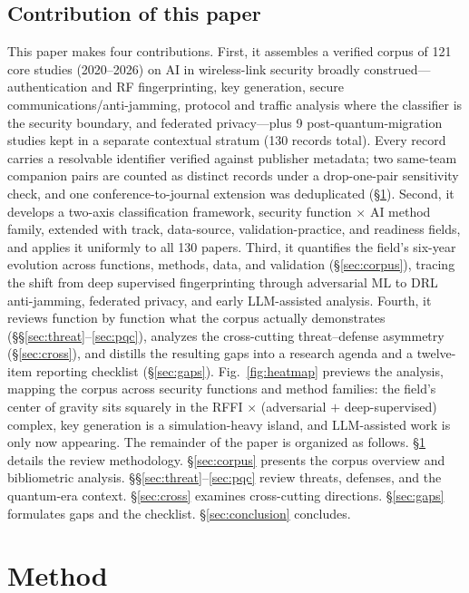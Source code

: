 \documentclass[10.5pt,compsoc,winfonts]{ICN}
\begin{document}
\subsection{Contribution of this paper}
This paper makes four contributions. First, it assembles a verified corpus of 121 core studies (2020–2026) on AI in wireless-link security broadly construed—authentication and RF fingerprinting, key generation, secure communications/anti-jamming, protocol and traffic analysis where the classifier is the security boundary, and federated privacy—plus 9 post-quantum-migration studies kept in a separate contextual stratum (130 records total). Every record carries a resolvable identifier verified against publisher metadata; two same-team companion pairs are counted as distinct records under a drop-one-pair sensitivity check, and one conference-to-journal extension was deduplicated (\S\ref{sec:methods}). Second, it develops a two-axis classification framework, security function $\times$ AI method family, extended with track, data-source, validation-practice, and readiness fields, and applies it uniformly to all 130 papers. Third, it quantifies the field's six-year evolution across functions, methods, data, and validation (\S\ref{sec:corpus}), tracing the shift from deep supervised fingerprinting through adversarial ML to DRL anti-jamming, federated privacy, and early LLM-assisted analysis. Fourth, it reviews function by function what the corpus actually demonstrates (\S\S\ref{sec:threat}–\ref{sec:pqc}), analyzes the cross-cutting threat–defense asymmetry (\S\ref{sec:cross}), and distills the resulting gaps into a research agenda and a twelve-item reporting checklist (\S\ref{sec:gaps}).
Fig.~\ref{fig:heatmap} previews the analysis, mapping the corpus across security functions and method families: the field's center of gravity sits squarely in the RFFI $\times$ (adversarial $+$ deep-supervised) complex, key generation is a simulation-heavy island, and LLM-assisted work is only now appearing. The remainder of the paper is organized as follows. \S\ref{sec:methods} details the review methodology. \S\ref{sec:corpus} presents the corpus overview and bibliometric analysis. \S\S\ref{sec:threat}–\ref{sec:pqc} review threats, defenses, and the quantum-era context. \S\ref{sec:cross} examines cross-cutting directions. \S\ref{sec:gaps} formulates gaps and the checklist. \S\ref{sec:conclusion} concludes.

\section{Method}
\label{sec:methods}
\end{document}
